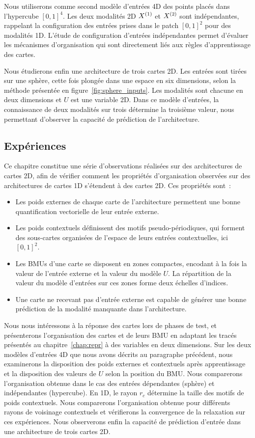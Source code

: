 \documentclass[../main]{subfiles}
\begin{document}
Nous utiliserons comme second modèle d'entrées 4D des points placés dans l'hypercube $[0,1]^4$. Les deux modalités 2D $X^{({1})}$ et $X^{({2})}$ sont indépendantes, rappelant la configuration des entrées prises dans le patch $[0,1]^2$ pour des modalités 1D. L'étude de configuration d'entrées indépendantes permet d'évaluer les mécanismes d'organisation qui sont directement liés aux règles d'apprentissage des cartes.

Nous étudierons enfin une architecture de trois cartes 2D. Les entrées sont tirées sur une sphère, cette fois plongée dans une espace en six dimensions, selon la méthode présentée en figure~\ref{fig:sphere_inputs}. Les modalités sont chacune en deux dimensions et $U$ est une variable 2D. Dans ce modèle d'entrées, la connaissance de deux modalités sur trois détermine la troisième valeur, nous permettant d'observer la capacité de prédiction de l'architecture.

\subsection{Expériences}

Ce chapitre constitue une série d'observations réalisées sur des architectures de cartes 2D, afin de vérifier comment les propriétés d'organisation observées sur des architectures de cartes 1D s'étendent à des cartes 2D.
Ces propriétés sont~:
\begin{itemize}
	\item Les poids externes de chaque carte de l'architecture permettent une bonne quantification vectorielle de leur entrée externe.
	\item Les poids contextuels définissent des motifs pseudo-périodiques, qui forment des sous-cartes organisées de l'espace de leurs entrées contextuelles, ici $[0,1]^2$.
	\item Les BMUs d'une carte se disposent en zones compactes, encodant à la fois la valeur de l'entrée externe et la valeur du modèle $U$. La répartition de la valeur du modèle d'entrées sur ces zones forme deux échelles d'indices.
	\item Une carte ne recevant pas d'entrée externe est capable de générer une bonne prédiction de la modalité manquante dans l'architecture.
\end{itemize}

Nous nous intéressons à la réponse des cartes lors de phases de test, et présenterons l'organisation des cartes et de leurs BMU en adaptant les tracés présentés au chapitre~\ref{chap:repr} à des variables en deux dimensions.
Sur les deux modèles d'entrées 4D que nous avons décrits au paragraphe précédent, nous examinerons la disposition des poids externes et contextuels après apprentissage et la disposition des valeurs de $U$ selon la position du BMU. Nous comparerons l'organisation obtenue dans le cas des entrées dépendantes (sphère) et indépendantes (hypercube).
En 1D, le rayon $r_c$ détermine la taille des motifs de poids contextuels. Nous comparerons l'organisation obtenue pour différents rayons de voisinage contextuels et vérifierons la convergence de la relaxation sur ces expériences. Nous observerons enfin la capacité de prédiction d'entrée dans une architecture de trois cartes 2D.
\end{document}
